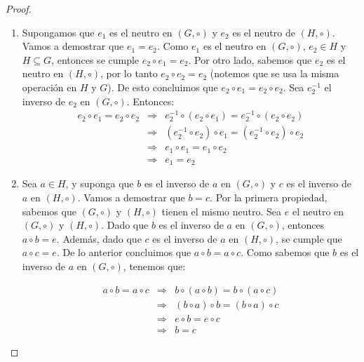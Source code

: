 \begin{proof}
\text{ }
	\begin{enumerate}
	\item Supongamos que $e_1$ es el neutro en $(G, \circ)$ y $e_2$ es el neutro de $(H, \circ)$. Vamos a demostrar que $e_1 = e_2$.
Como $e_1$ es el neutro en $(G, \circ)$, $e_2\in H$ y $H \subseteq G$, entonces se cumple $e_2 \circ e_1 = e_2$.
Por otro lado, sabemos que $e_2$ es el neutro en $(H, \circ)$, por lo tanto $e_2 \circ e_2 = e_2$
(notemos que se usa la misma operación en $H$ y $G$).
De esto concluimos que $e_2 \circ e_1 = e_2 \circ e_2$.
Sea $e^{-1}_2$ el inverso de $e_2$ en $(G, \circ)$. Entonces:
\begin{eqnarray*}
e_2 \circ e_1 = e_2 \circ e_2 & \Rightarrow & e^{-1}_2 \circ (e_2
\circ e_1) =  e^{-1}_2 \circ (e_2 \circ e_2)\\
& \Rightarrow & (e^{-1}_2 \circ e_2) \circ e_1 =  (e^{-1}_2 \circ e_2)
\circ e_2\\ 
& \Rightarrow & e_1 \circ e_1 =  e_1 \circ e_2\\ 
& \Rightarrow & e_1 = e_2
\end{eqnarray*}


	
	\item
	Sea $a \in H$, y suponga que $b$ es el inverso de $a$ en $(G,
\circ)$ y $c$ es el inverso de $a$ en $(H, \circ)$. Vamos a demostrar que $b = c$.
Por la primera propiedad, sabemos que $(G, \circ)$ y $(H,
\circ)$ tienen el mismo neutro. Sea $e$ el neutro en $(G, \circ)$ y $(H, \circ)$. 
Dado que $b$ es el inverso de $a$ en $(G, \circ)$, entonces $a \circ b = e$. Además, dado que $c$ es el inverso de $a$ en $(H, \circ)$, se cumple que $a \circ c = e$. De lo anterior concluimos que $a \circ b = a \circ c$.
Como sabemos que $b$ es el inverso de $a$ en $(G, \circ)$, tenemos que:

\begin{eqnarray*}
a \circ b = a \circ c & \Rightarrow & b \circ (a
\circ b) =  b \circ (a \circ c)\\
& \Rightarrow & (b \circ a) \circ b =  (b \circ a)
\circ c\\ 
& \Rightarrow & e \circ b =  e \circ c\\ 
& \Rightarrow & b = c
\end{eqnarray*}
	\end{enumerate}
\end{proof}


